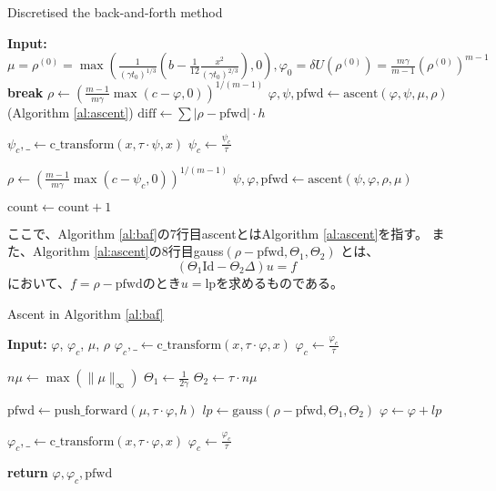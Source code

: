 \begin{algorithm}
    \caption{Discretised the back-and-forth method}
    \label{al:baf}
    \begin{algorithmic}[1]
        \State \textbf{Input:} $\mu = \rho^{(0)} = \max\left(\frac{1}{(\gamma t_0)^{1/3}}\left(b - \frac{1}{12}\frac{x^2}{(\gamma t_0)^{2/3}}\right),0\right), \varphi_0 = \delta U(\rho^{(0)}) = \frac{m \gamma}{m-1} \left(\rho^{(0)}\right)^{m-1}$
                \State \textbf{break}
            \EndIf
            \State $\rho \leftarrow \left(\frac{m-1}{m\gamma}\max(c - \varphi, 0)\right)^{1/(m-1)}$
            \State $\varphi, \psi, \text{pfwd} \leftarrow \text{ascent}(\varphi, \psi, \mu, \rho)$ (Algorithm \ref{al:ascent})
            \State $\text{diff} \leftarrow \sum \left|\rho - \text{pfwd}\right| \cdot h$
    
            \State $\psi_c, \_ \leftarrow \text{c\_transform}(x, \tau \cdot \psi, x)$ 
            \State $\psi_c \leftarrow \frac{\psi_c}{\tau}$
    
            \State $\rho \leftarrow \left(\frac{m-1}{m\gamma}\max(c - \psi_c, 0)\right)^{1/(m-1)}$
            \State $\psi, \varphi, \text{pfwd} \leftarrow \text{ascent}(\psi, \varphi, \rho, \mu)$
    
            \State $\text{count} \leftarrow \text{count} + 1$
        \EndWhile
    \end{algorithmic}
\end{algorithm}
ここで、Algorithm \ref{al:baf}の7行目ascentとはAlgorithm \ref{al:ascent}を指す。
また、Algorithm \ref{al:ascent}の8行目gauss$(\rho - \text{pfwd}, \Theta_1, \Theta_2)$ とは、
\[
    (\Theta_1 \text{Id} - \Theta_2 \Delta)u = f
\]
において、$f = \rho - \text{pfwd}$のとき$u = \text{lp}$を求めるものである。
    \begin{algorithm}
        \caption{Ascent in Algorithm \ref{al:baf}}
        \label{al:ascent}
        \begin{algorithmic}[1]
            \State \textbf{Input:} $\varphi$, $\varphi_c$, $\mu$, $\rho$
            \State $\varphi_c, \_ \leftarrow \text{c\_transform}(x, \tau \cdot \varphi, x)$ 
            \State $\varphi_c \leftarrow \frac{\varphi_c}{\tau}$
        
            \State $n\mu \leftarrow \max(\lVert\mu\rVert_\infty)$
            \State $\Theta_1 \leftarrow \frac{1}{2\gamma}$
            \State $\Theta_2 \leftarrow \tau \cdot n\mu$
        
            \State $\text{pfwd} \leftarrow \text{push\_forward}(\mu, \tau \cdot \varphi, h)$ 
            \State $lp \leftarrow \text{gauss}(\rho - \text{pfwd}, \Theta_1, \Theta_2)$ 
            \State $\varphi \leftarrow \varphi + lp$ 
            
            \State $\varphi_c, \_ \leftarrow \text{c\_transform}(x, \tau \cdot \varphi, x)$
            \State $\varphi_c \leftarrow \frac{\varphi_c}{\tau}$
    
            \State \textbf{return}  $\varphi, \varphi_c, \text{pfwd}$ 
        \end{algorithmic}
    \end{algorithm}